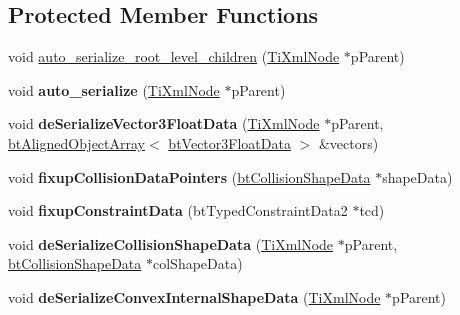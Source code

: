 \subsection*{Protected Member Functions}
\begin{DoxyCompactItemize}
\item 
void \hyperlink{classbt_bullet_xml_world_importer_ad30fee668904a6305512d32a28f15a12}{auto\+\_\+serialize\+\_\+root\+\_\+level\+\_\+children} (\hyperlink{class_ti_xml_node}{Ti\+Xml\+Node} $\ast$p\+Parent)
\item 
\hypertarget{classbt_bullet_xml_world_importer_a25ae01cb097b332589f5f284d87a0185}{void {\bfseries auto\+\_\+serialize} (\hyperlink{class_ti_xml_node}{Ti\+Xml\+Node} $\ast$p\+Parent)}\label{classbt_bullet_xml_world_importer_a25ae01cb097b332589f5f284d87a0185}

\item 
\hypertarget{classbt_bullet_xml_world_importer_a405327fc4be0714403e010e56f0c5ef6}{void {\bfseries de\+Serialize\+Vector3\+Float\+Data} (\hyperlink{class_ti_xml_node}{Ti\+Xml\+Node} $\ast$p\+Parent, \hyperlink{classbt_aligned_object_array}{bt\+Aligned\+Object\+Array}$<$ \hyperlink{structbt_vector3_float_data}{bt\+Vector3\+Float\+Data} $>$ \&vectors)}\label{classbt_bullet_xml_world_importer_a405327fc4be0714403e010e56f0c5ef6}

\item 
\hypertarget{classbt_bullet_xml_world_importer_a218ec910ae51ab71cb1ad3fa1a2a3e49}{void {\bfseries fixup\+Collision\+Data\+Pointers} (\hyperlink{structbt_collision_shape_data}{bt\+Collision\+Shape\+Data} $\ast$shape\+Data)}\label{classbt_bullet_xml_world_importer_a218ec910ae51ab71cb1ad3fa1a2a3e49}

\item 
\hypertarget{classbt_bullet_xml_world_importer_a6faa52785fce19c4c7fc2518ed4f990b}{void {\bfseries fixup\+Constraint\+Data} (bt\+Typed\+Constraint\+Data2 $\ast$tcd)}\label{classbt_bullet_xml_world_importer_a6faa52785fce19c4c7fc2518ed4f990b}

\item 
\hypertarget{classbt_bullet_xml_world_importer_ae6a73b75b9246d21213c56f551235baa}{void {\bfseries de\+Serialize\+Collision\+Shape\+Data} (\hyperlink{class_ti_xml_node}{Ti\+Xml\+Node} $\ast$p\+Parent, \hyperlink{structbt_collision_shape_data}{bt\+Collision\+Shape\+Data} $\ast$col\+Shape\+Data)}\label{classbt_bullet_xml_world_importer_ae6a73b75b9246d21213c56f551235baa}

\item 
\hypertarget{classbt_bullet_xml_world_importer_a65070d2e22cc1cd71be575ce1e96c16a}{void {\bfseries de\+Serialize\+Convex\+Internal\+Shape\+Data} (\hyperlink{class_ti_xml_node}{Ti\+Xml\+Node} $\ast$p\+Parent)}\label{classbt_bullet_xml_world_importer_a65070d2e22cc1cd71be575ce1e96c16a}


\end{DoxyCompactItemize}

